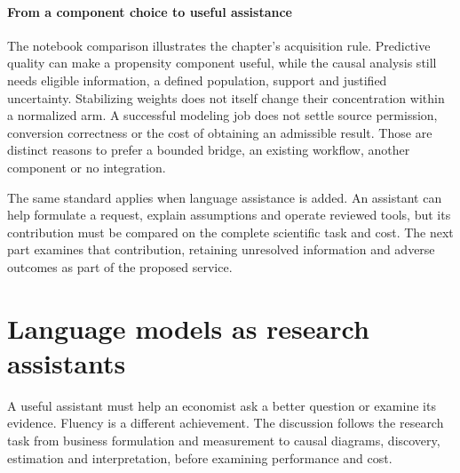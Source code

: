 \subsection{From a component choice to useful assistance}

The notebook comparison illustrates the chapter's acquisition rule. Predictive
quality can make a propensity component useful, while the causal analysis
still needs eligible information, a defined population, support and justified
uncertainty. Stabilizing weights does not itself change their concentration
within a normalized arm. A successful modeling job does not settle source
permission, conversion correctness or the cost of obtaining an admissible
result. Those are distinct reasons to prefer a bounded bridge, an existing
workflow, another component or no integration.

The same standard applies when language assistance is added. An assistant can
help formulate a request, explain assumptions and operate reviewed tools, but
its contribution must be compared on the complete scientific task and cost.
The next part examines that contribution, retaining unresolved information
and adverse outcomes as part of the proposed service.



\part{Language models as research assistants}
\label{reading:part-language}
A useful assistant must help an economist ask a better question or examine
its evidence. Fluency is a different achievement. The discussion follows the
research task from business formulation and measurement to causal diagrams,
discovery, estimation and interpretation, before examining performance and cost.




